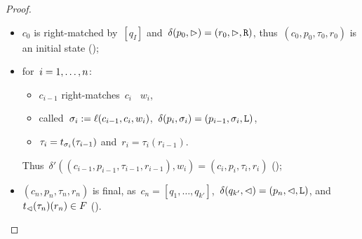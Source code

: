 \begin{proof}
	\begin{itemize}
		\item $c_0$ is right-matched by~$[q_I]$ and~$\delta(p_0,\rhd)=(r_0,\rhd,\mathtt R)$, thus~$(c_0,p_0,\tau_0,r_0)$ is an initial state ();
		\item for~$i=1,\dots,n$:
		      \begin{itemize}
			      \item $c_{i-1}$ right-matches~$c_i$ \wrt~$w_i$,
			      \item called~$\sigma_i:=\ell(c_{i-1},c_i,w_i)$,~$\delta(p_i,\sigma_i)=(p_{i-1},\sigma_i,\mathtt L)$,
			      \item $\tau_i=t_{\sigma_i}(\tau_{i-1})$ and~$r_i=\tau_i(r_{i-1})$.
		      \end{itemize}
		      Thus~$\delta'((c_{i-1},p_{i-1},\tau_{i-1},r_{i-1}),w_i)=(c_i,p_i,\tau_i,r_i)$ ();
		\item $(c_n,p_n,\tau_n,r_n)$ is final, as~$c_n=[q_1,\dots,q_{k'}]$,~$\delta(q_{k'},\lhd)=(p_n,\lhd,\mathtt L)$, and $t_\lhd(\tau_n)(r_n)\in F$ (). \qedhere
	\end{itemize}
\end{proof}

